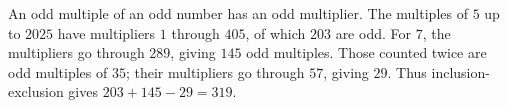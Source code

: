 An odd multiple of an odd number has an odd multiplier. The multiples of $5$ up to $2025$ have multipliers $1$ through $405$, of which $203$ are odd. For $7$, the multipliers go through $289$, giving $145$ odd multiples. Those counted twice are odd multiples of $35$; their multipliers go through $57$, giving $29$. Thus inclusion-exclusion gives $\boxed{203+145-29=319}$.
